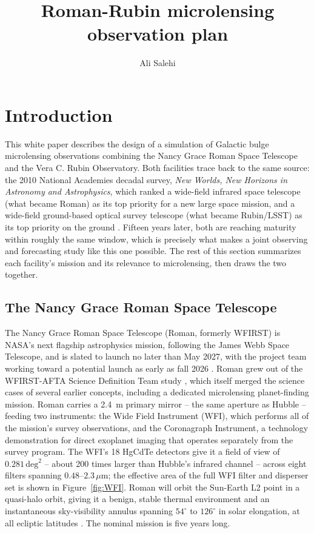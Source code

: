 \documentclass[english,10pt,a4paper]{article}
\title{Roman-Rubin microlensing observation plan}
\author{Ali Salehi}
\begin{document}
	\maketitle
	
	
	\section{Introduction}
	\label{sec:intro}
	
	This white paper describes the design of a simulation of Galactic bulge microlensing observations combining the Nancy Grace Roman Space Telescope and the Vera C. Rubin Observatory. Both facilities trace back to the same source: the 2010 National Academies decadal survey, \textit{New Worlds, New Horizons in Astronomy and Astrophysics}, which ranked a wide-field infrared space telescope (what became Roman) as its top priority for a new large space mission, and a wide-field ground-based optical survey telescope (what became Rubin/LSST) as its top priority on the ground \cite{Spergel2015WFIRST,RubinAbout}. Fifteen years later, both are reaching maturity within roughly the same window, which is precisely what makes a joint observing and forecasting study like this one possible. The rest of this section summarizes each facility's mission and its relevance to microlensing, then draws the two together.
	
	\subsection{The Nancy Grace Roman Space Telescope}
	\label{subsec:roman_overview}
	
	The Nancy Grace Roman Space Telescope (Roman, formerly WFIRST) is NASA's next flagship astrophysics mission, following the James Webb Space Telescope, and is slated to launch no later than May 2027, with the project team working toward a potential launch as early as fall 2026 \cite{RomanMissionOverview}. Roman grew out of the WFIRST-AFTA Science Definition Team study \cite{Spergel2015WFIRST}, which itself merged the science cases of several earlier concepts, including a dedicated microlensing planet-finding mission. Roman carries a 2.4~m primary mirror -- the same aperture as Hubble -- feeding two instruments: the Wide Field Instrument (WFI), which performs all of the mission's survey observations, and the Coronagraph Instrument, a technology demonstration for direct exoplanet imaging that operates separately from the survey program. The WFI's 18 HgCdTe detectors give it a field of view of $0.281\,\mathrm{deg}^2$ -- about 200 times larger than Hubble's infrared channel -- across eight filters spanning $0.48$--$2.3\,\mu\mathrm{m}$; the effective area of the full WFI filter and disperser set is shown in Figure~\ref{fig:WFI}. Roman will orbit the Sun-Earth L2 point in a quasi-halo orbit, giving it a benign, stable thermal environment and an instantaneous sky-visibility annulus spanning $54^{\circ}$ to $126^{\circ}$ in solar elongation, at all ecliptic latitudes \cite{RomanMissionOverview}. The nominal mission is five years long.
	
\end{document}
